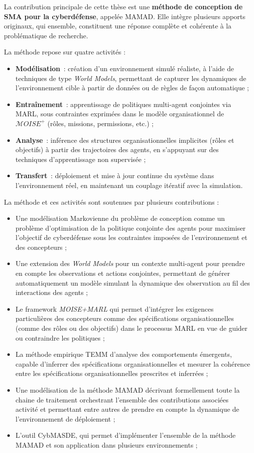 La contribution principale de cette thèse est une \textbf{méthode de conception de SMA pour la cyberdéfense}, appelée \ac{MAMAD}. Elle intègre plusieurs apports originaux, qui ensemble, constituent une réponse complète et cohérente à la problématique de recherche.

La méthode repose sur quatre activités :
\begin{itemize}
    \item \textbf{Modélisation}~: création d'un environnement simulé réaliste, à l'aide de techniques de type \textit{World Models}, permettant de capturer les dynamiques de l'environnement cible à partir de données ou de règles de façon automatique ;
    \item \textbf{Entraînement}~: apprentissage de politiques multi-agent conjointes via MARL, sous contraintes exprimées dans le modèle organisationnel de $\mathcal{M}OISE^+$ (rôles, missions, permissions, etc.) ;
    \item \textbf{Analyse}~: inférence des structures organisationnelles implicites (rôles et objectifs) à partir des trajectoires des agents, en s'appuyant sur des techniques d'apprentissage non supervisée ;
    \item \textbf{Transfert}~: déploiement et mise à jour continue du système dans l'environnement réel, en maintenant un couplage itératif avec la simulation.
\end{itemize}

La méthode et ces activités sont soutenues par plusieurs contributions :
\begin{itemize}
    \item Une modélisation Markovienne du problème de conception comme un problème d'optimisation de la politique conjointe des agents pour maximiser l'objectif de cyberdéfense sous les contraintes imposées de l'environnement et des concepteurs ;
    \item Une extension des \textit{World Models} pour un contexte multi-agent pour prendre en compte les observations et actions conjointes, permettant de générer automatiquement un modèle simulant la dynamique des observation au fil des interactions des agents ;
    \item Le framework \textit{MOISE+MARL} qui permet d'intégrer les exigences particulières des concepteurs comme des spécifications organisationnelles (comme des rôles ou des objectifs) dans le processus MARL en vue de guider ou contraindre les politiques ;
    \item La méthode empirique \ac{TEMM} d'analyse des comportements émergents, capable d'inferrer des spécifications organisationnelles et mesurer la cohérence entre les spécifications organisationnelles prescrites et inferrées ;
    \item Une modélisation de la méthode MAMAD décrivant formellement toute la chaine de traitement orchestrant l'ensemble des contributions associées activité et permettant entre autres de prendre en compte la dynamique de l'environnement de déploiement ;
    \item L'outil \ac{CybMASDE}, qui permet d'implémenter l'ensemble de la méthode MAMAD et son application dans plusieurs environnements ;
\end{itemize}

